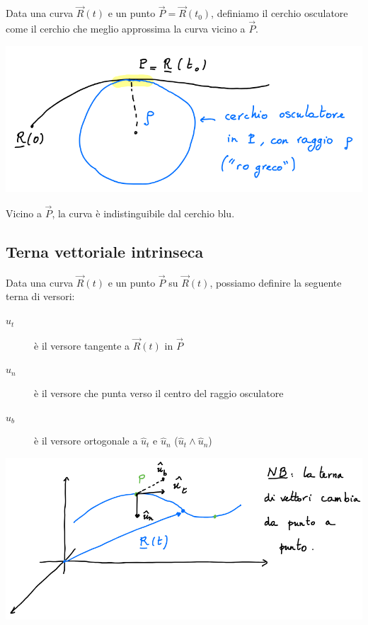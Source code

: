 \documentclass{article}
\begin{document}
Data una curva $\vec{R}(t)$ e un punto $\vec{P} = \vec{R}(t_0)$, definiamo il cerchio osculatore come il cerchio che meglio approssima la curva vicino a $\vec{P}$.

\includegraphics[width=\columnwidth]{cerchio-osculatore}

\noindent
Vicino a $\vec{P}$, la curva è indistinguibile dal cerchio blu.

\subsection{Terna vettoriale intrinseca}

Data una curva $\vec{R}(t)$ e un punto $\vec{P}$ su $\vec{R}(t)$, possiamo definire la seguente terna di versori:

\begin{description}
    \item[$\hat{u}_t$] è il versore tangente a $\vec{R}(t)$ in $\vec{P}$
    \item[$\hat{u}_n$] è il versore che punta verso il centro del raggio osculatore
    \item[$\hat{u}_b$] è il versore ortogonale a $\hat{u}_t$ e $\hat{u}_n$ ($\hat{u}_t \wedge \hat{u}_n$)
\end{description}

\includegraphics[width=\columnwidth]{esempio-terna-vettoriale-intrinseca}
\end{document}
